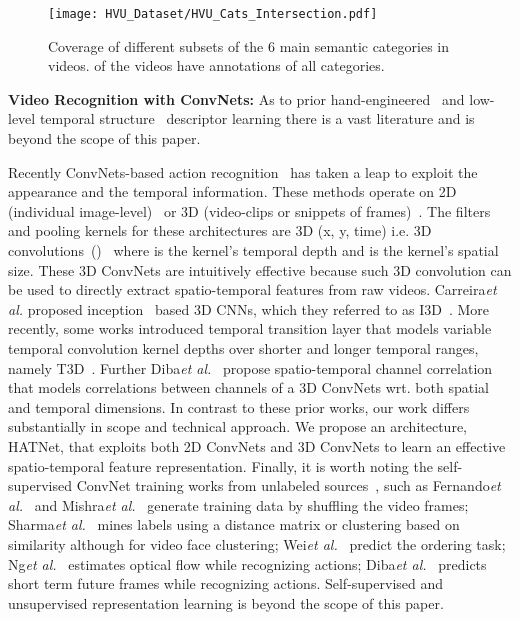 \documentclass[runningheads]{llncs}
\begin{document}
\begin{figure*}[t]
    \centering
    \texttt{[image: HVU\_Dataset/HVU\_Cats\_Intersection.pdf]}
    \vspace{-0.45cm}
    \caption{Coverage of different subsets of the 6 main semantic categories in videos.  of the videos have annotations of all categories.}
    \label{fig:chart_interscetion}
    \vspace{-0.7cm}
\end{figure*}

\noindent
\textbf{Video Recognition with ConvNets:} 
As to prior hand-engineered~\cite{mbh,hog3d,hof,sift3d,idt,esurf} and low-level temporal structure~\cite{basura,actoms,temporalactiondecomposition,dynamicposelets} descriptor learning there
is a vast literature and is beyond the scope of this paper.

Recently ConvNets-based action recognition~\cite{pooling,sport1m,twostream,c3d,tsn} has taken a leap to exploit the appearance and the temporal information. These methods operate on 2D (individual image-level)~\cite{tle,lstm1,actionvlad,sun3d,fishernet,tsn,n3d} or 3D (video-clips or snippets of  frames)~\cite{pooling,c3d,res3d,R2+1}. The filters and pooling kernels for these architectures are 3D (x, y, time) i.e. 3D convolutions~()~\cite{n3d} where  is the kernel's temporal depth and  is the kernel's spatial size. These 3D ConvNets are intuitively effective because such 3D convolution can be used to directly extract spatio-temporal features from raw videos. Carreira\textit{et al.} proposed inception~\cite{inception} based 3D CNNs, which they referred to as I3D~\cite{i3d}. More recently, some works introduced temporal transition layer that models variable temporal convolution kernel depths over shorter and longer temporal ranges, namely T3D~\cite{t3d}. Further Diba\textit{et al.}~\cite{stcnn} propose spatio-temporal channel correlation that models correlations between channels of a 3D ConvNets wrt. both spatial and temporal dimensions. In contrast to these prior works, our work differs substantially in scope and technical approach. We propose an architecture, HATNet, that exploits both 2D ConvNets and 3D ConvNets to learn an effective  spatio-temporal feature representation. Finally, it is worth noting the self-supervised ConvNet training works from unlabeled sources~\cite{disinit,sharmatbiom,sharmavo}, such as Fernando\textit{et al.}~\cite{Odd-one} and Mishra\textit{et al.}~\cite{Shuffle} generate training data by shuffling the video frames; Sharma\textit{et al.}~\cite{sharmaacmmm,sharmacvpr17,sharmafg,sharmafg20} mines labels using a distance matrix or clustering based on similarity although for video face clustering; Wei\textit{et al.}~\cite{wei} predict the ordering task; Ng\textit{et al.}~\cite{actionflow} estimates optical flow while recognizing actions; Diba\textit{et al.}~\cite{dynamonet} predicts short term future frames while recognizing actions. Self-supervised and unsupervised representation learning is beyond the scope of this paper. 
\end{document}
